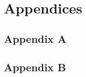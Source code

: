 \documentclass[12pt,oneside,letterpaper]{report}
\begin{document}
\chapter{Appendices} %


\section*{Appendix A}

\clearpage
{}

\section*{Appendix B}

\clearpage
{}



\cleardoublepage
{}

%
%
%

% 

\printbibliography
\end{document}
